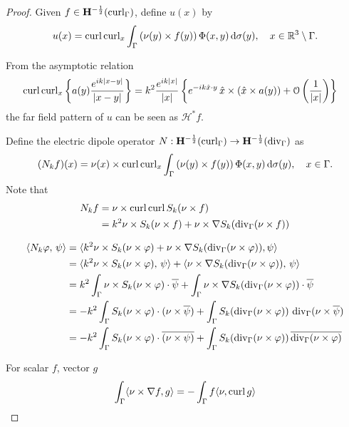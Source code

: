 \begin{proof}
  Given $f\in{\bf H}^{-\frac{1}{2}}(\operatorname{curl}_\Gamma)$, define $u(x)$ by
  \begin{align*}
    u(x) = \operatorname{curl}\operatorname{curl}_x\int_{\Gamma}\left(\nu(y)\times f(y)\right)\Phi(x,y)\,\text{d}\sigma(y),\quad x\in\mathbb{R}^3\setminus\Gamma.
  \end{align*}
  
  From the asymptotic relation
  \begin{align*}
    \operatorname{curl}\operatorname{curl}_x\left\{a(y)\frac{e^{ik|x-y|}}{|x-y|}\right\} &= k^2\frac{e^{ik|x|}}{|x|}\left\{e^{-ik\hat{x}\cdot y}\,\hat{x}\times(\hat{x}\times a(y)) + \mathcal{O}\left(\frac{1}{|x|}\right)\right\} 
  \end{align*}
  the far field pattern of $u$ can be seen as $\mathcal{H}^*f$. 

  Define the electric dipole operator $N:{\bf H}^{-\frac{1}{2}}(\operatorname{curl}_\Gamma)\rightarrow{\bf H}^{-\frac{1}{2}}(\operatorname{div}_\Gamma)$ as
  \begin{align}
    (N_k f)(x) = \nu(x)\times\operatorname{curl}\operatorname{curl}_x\int_{\Gamma}\left(\nu(y)\times f(y)\right)\Phi(x,y)\,\text{d}\sigma(y),\quad x\in\Gamma.
  \end{align}
  Note that
  \begin{align}\label{eq:N}
    N_k f &= \nu\times \operatorname{curl}\operatorname{curl} S_k (\nu\times f) \\ &= k^2\nu\times S_k(\nu\times f) + \nu\times\nabla S_k(\operatorname{div}_\Gamma(\nu\times f))
  \end{align}
  
  \begin{align*}
    \langle N_k\varphi,\,\psi\rangle &=\langle k^2\nu\times S_k(\nu\times\varphi) + \nu\times\nabla S_k(\operatorname{div}_\Gamma(\nu\times\varphi)), \psi\rangle \\ 
    &=\langle k^2\nu\times S_k(\nu\times\varphi),\,\psi\rangle+\langle\nu\times\nabla S_k(\operatorname{div}_\Gamma(\nu\times\varphi)),\,\psi\rangle \\
    &=k^2\int_{\Gamma}\nu\times S_k(\nu\times\varphi)\cdot\overline{\psi}+\int_{\Gamma}\nu\times\nabla S_k(\operatorname{div}_\Gamma(\nu\times\varphi))\cdot\overline{\psi} \\
    &=-k^2\int_{\Gamma}S_k(\nu\times\varphi)\cdot(\nu\times\overline{\psi})+\int_{\Gamma}S_k(\operatorname{div}_\Gamma(\nu\times\varphi))\,\operatorname{div}_\Gamma(\nu\times\overline{\psi})\\
    &=-k^2\int_{\Gamma}S_k(\nu\times\varphi)\cdot\overline{(\nu\times\psi)}+\int_{\Gamma}S_k(\operatorname{div}_\Gamma(\nu\times\varphi))\,\overline{\operatorname{div}_\Gamma(\nu\times\varphi)}
  \end{align*}

For scalar $f$, vector $g$
\begin{align*}
  \int_{\Gamma}\langle\nu\times\nabla f, g\rangle = -\int_{\Gamma}f\langle\nu, \operatorname{curl} g\rangle
\end{align*}


\end{proof}
